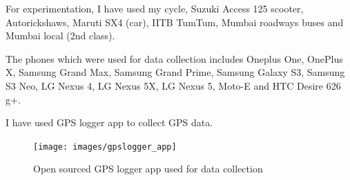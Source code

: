 \documentclass[12pt]{report}
\begin{document}
For experimentation, I have used my cycle, Suzuki Access 125 scooter,
Autorickshaws, Maruti SX4 (car), IITB TumTum, Mumbai roadways buses and Mumbai
local (2nd class).

The phones which were used for data collection includes Oneplus One, OnePlus X,
Samsung Grand Max, Samsung Grand Prime, Samsung Galaxy S3, Samsung S3 Neo, LG
Nexus 4, LG Nexus 5X, LG Nexus 5, Moto-E and HTC Desire 626 g+.

I have used GPS logger app \cite[]{gps_logger_app} \cite[]{gps_logger_website}
to collect GPS data.

 \begin{figure}[h]
     \centering
     \texttt{[image: images/gpslogger\_app]}
     \caption{Open sourced GPS logger app used for data collection}
   \label{gpslogger_app}
 \end{figure}

 \pagebreak



\end{document}
